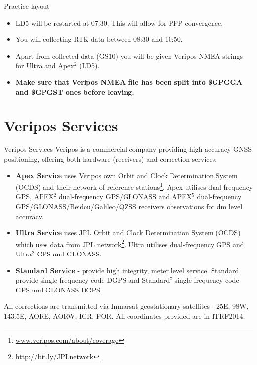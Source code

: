 \documentclass[11pt]{beamer}
\begin{document}
\begin{frame}{Practice layout}
	
	\begin{itemize}
		\item LD5 will be restarted at 07:30. This will allow for PPP convergence. 
		\item You will collecting RTK data between 08:30 and 10:50. 
		\item Apart from collected data (GS10) you will be given Veripos NMEA strings for Ultra and Apex$^2$ (LD5).
		\item \textbf{Make sure that Veripos NMEA file has been split into \$GPGGA and \$GPGST ones before leaving.}
	\end{itemize}

\end{frame}


\section{Veripos Services}

\begin{frame}[allowframebreaks]{Veripos Services}
	Veripos is a commercial company providing high accuracy GNSS positioning, offering both hardware (receivers) and correction services:
	
	\begin{itemize}
		\item \textbf{Apex Service} uses Veripos own Orbit and Clock Determination System (OCDS) and their network of reference stations\footnote[frame]{\url{www.veripos.com/about/coverage}}. Apex utilises dual-frequency GPS, APEX$^2$ dual-frequency GPS/GLONASS and APEX$^5$  dual-frequency GPS/GLONASS/Beidou/Galileo/QZSS receivers observations for dm level accuracy.
		\item \textbf{Ultra Service} uses JPL Orbit and Clock Determination System (OCDS) which uses data from JPL network\footnote{\url{http://bit.ly/JPLnetwork}}. Ultra utilises dual-frequency GPS and Ultra$^2$ GPS and GLONASS.
		\item \textbf{Standard Service} - provide high integrity, meter level service. Standard provide single frequency code DGPS and Standard$^2$ single frequency code GPS and GLONASS DGPS.
	\end{itemize}
	All corrections are transmitted via Inmarsat geostationary satellites - 25E, 98W, 143.5E, AORE, AORW, IOR, POR. All coordinates provided are in ITRF2014.

\end{frame}
\end{document}
